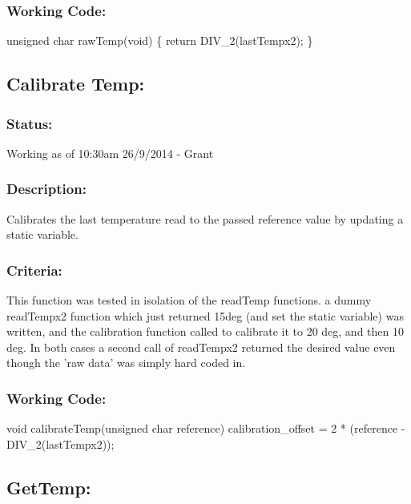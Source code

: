 \documentclass[]{article}
\begin{document}
\subsubsection{Working Code:}
unsigned char rawTemp(void) \newline
\{ \newline
	return DIV\_2(lastTempx2); \newline
\} \newline

\subsection{Calibrate Temp:}
\subsubsection{Status:}
Working as of 10:30am 26/9/2014 - Grant

\subsubsection{Description:}
Calibrates the last temperature read to the passed reference value by updating a static variable.

\subsubsection{Criteria:}
This function was tested in isolation of the readTemp functions. a dummy readTempx2 function which just returned 15deg (and set the static variable) was written, and the calibration function called to calibrate it to 20 deg, and then 10 deg. In both cases a second call of readTempx2 returned the desired value even though the 'raw data' was simply hard coded in.

\subsubsection{Working Code:}
void calibrateTemp(unsigned char reference) \newline
{ \newline
	calibration\_offset = 2 * (reference - DIV\_2(lastTempx2)); \newline
} \newline

\subsection{GetTemp:}
\end{document}
